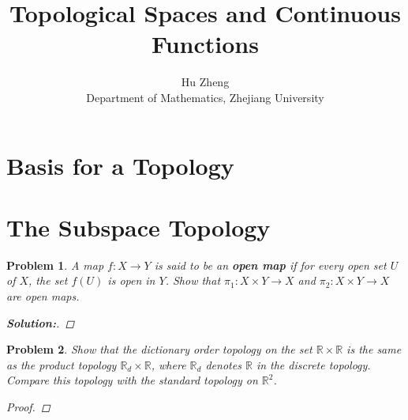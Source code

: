 \documentclass[11pt]{article}
\title{Topological Spaces and Continuous Functions}
\author{Hu Zheng \\ Department of Mathematics, Zhejiang University}
\newcommand{\mr}{\mathbb{R}}
\newtheorem{problem}{Problem}
\numberwithin{problem}{section}
\newenvironment{solution}
               {\let\oldqedsymbol=\qedsymbol
                \renewcommand{\qedsymbol}{$\blacktriangleleft$}
                \begin{proof}[\bfseries\upshape Solution:]}
               {\end{proof}
                \renewcommand{\qedsymbol}{\oldqedsymbol}}
\begin{document}
\maketitle

\section{Basis for a Topology}

\section{The Subspace Topology}

\begin{problem}
A map $f:X\rightarrow Y$ is said to be an \textbf{\textit{open map}} if for every open set $U$ of $X$, the set $f(U)$ is open in $Y$. Show that $\pi_1: X\times Y\rightarrow X$ and $\pi_2: X\times Y\rightarrow X$ are open maps.



\begin{solution}



\end{solution}
\end{problem}

\begin{problem}
Show that the dictionary order topology on the set $\mr\times\mr$ is the same as the product topology $\mr_d\times\mr$, where $\mr_d$ denotes $\mr$ in the discrete topology. Compare this topology with the standard topology on $\mr^2$.
\begin{proof}

\end{proof}
\end{problem}
\end{document}

